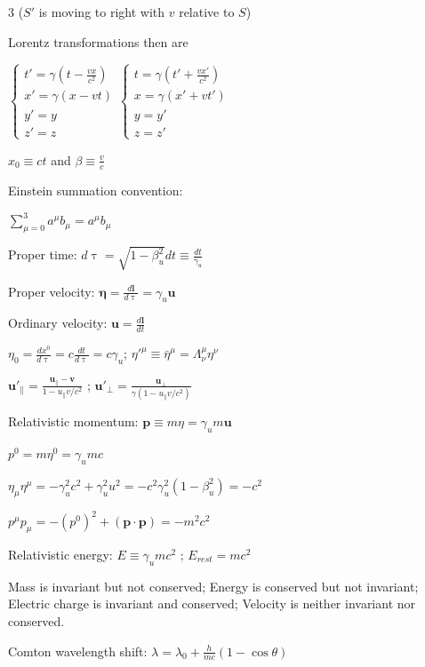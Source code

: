 \documentclass[a4paper,twoside]{article}
\begin{document}
\begin{multicols*}{3}
(\(S'\) is moving to right with \(v\) relative to \(S\))

Lorentz transformations then are

\(\begin{cases}
    t' = \gamma (t -  \frac{v x}{c^2}) \\
    x' = \gamma (x - vt) \\
    y' = y \\
    z' = z
\end{cases}
\begin{cases}
    t = \gamma (t' + \frac{v x'}{c^2}) \\
    x = \gamma (x' + vt') \\
    y = y' \\
    z = z'
\end{cases}\)

\(x_0 \equiv ct\) and \(\beta \equiv \frac{v}{c}\)

Einstein summation convention:

\(\sum_{\mu=0}^3 a^\mu b_\mu = a^\mu b_\mu\)

Proper time:
\(d\uptau = \sqrt{1 - \beta_u^2}dt \equiv \frac{dt}{\gamma_u}\)

Proper velocity:
\(\bm \eta = \frac{d\bm l}{d\uptau} = \gamma_u \bm u\) 

Ordinary velocity:
\(\bm u = \frac{d\bm l}{dt}\)

\(\eta_0 = \frac{dx^0}{d\uptau} = c \frac{dt}{d\uptau} = c\gamma_u\);
\(\eta'^\mu \equiv \bar{\eta}^\mu = \Lambda_\nu^\mu \eta^\nu\)

\(\bm u'_\parallel = \frac{\bm u_\parallel-\bm v}{1 - u_\parallel v/c^2}\) ; \(\bm u'_\perp = \frac{\bm u_\perp}{\gamma (1 - u_\parallel v/c^2)}\)

Relativistic momentum:
\(\bm p \equiv  m \eta =  \gamma_u m \bm u\)

\(p^0 = m\eta^0 = \gamma_u mc\)

\(\eta_\mu \eta^\mu = - \gamma_u^2 c^2 + \gamma_u^2 u^2 = -c^2\gamma_u^2(1-\beta_u^2) = -c^2\)

\(p^\mu p_\mu = -(p^0)^2+ (\bm p \cdot \bm p) = -m^2c^2\)



Relativistic energy:
\(E \equiv \gamma_u mc^2\) ;
\(E_{rest}=mc^2\)

Mass is invariant but not conserved;
Energy is conserved but not invariant;
Electric charge is invariant and conserved;
Velocity is neither invariant nor conserved.


Comton wavelength shift:
\(\lambda = \lambda_0 + \frac{h}{mc}(1-\cos \theta)\)


\end{multicols*}
\end{document}
